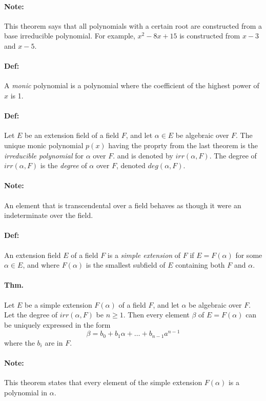 \documentclass[10pt,a4paper]{article}
\begin{document}
\paragraph{Note:} This theorem says that all polynomials with a certain root are constructed from a base irreducible polynomial. For example, $x^2 -8x + 15$ is constructed from $x-3$ and $x-5$.

\paragraph{Def:} A \textit{monic} polynomial is a polynomial where the coefficient of the highest power of $x$ is 1.

\paragraph{Def:} Let $E$ be an extension field of a field $F$, and let $\alpha \in E$ be algebraic over $F$. The unique monic polynomial $p(x)$ having the proprty from the last theorem is the \textit{irreducible polynomial} for $\alpha$ over $F$. and is denoted by $irr(\alpha, F)$. The degree of $irr(\alpha, F)$ is the \textit{degree} of $\alpha$ over $F$, denoted $deg(\alpha, F)$.

\paragraph{Note:} An element that is transcendental over a field behaves as though it were an indeterminate over the field. 

\paragraph{Def:} An extension field $E$ of a field $F$ is a \textit{simple extension} of $F$ if $E = F(\alpha)$ for some $\alpha \in E$, and where $F(\alpha)$ is the smallest subfield of $E$ containing both $F$ and $\alpha$.

\paragraph{Thm.} Let $E$ be a simple extension $F(\alpha)$ of a field $F$, and let $\alpha$ be algebraic over $F$. Let the degree of $irr(\alpha, F)$ be $n \geq 1$. Then every element $\beta$ of $E = F(\alpha)$ can be uniquely expressed in the form
$$ \beta = b_0 +b_1\alpha + \dots + b_{n-1}a^{n-1}$$
where the $b_i$ are in $F$.

\paragraph{Note:} This theorem states that every element of the simple extension $F(\alpha)$ is a polynomial in $\alpha$.
\end{document}
